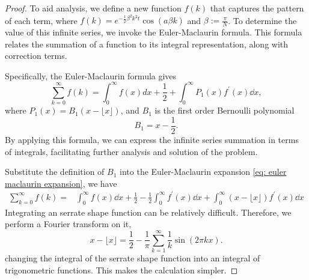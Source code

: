 \documentclass{article}
\begin{document}
\begin{proof}
To aid analysis, we define a new function $f(k)$ that captures the pattern of each term, where $f(k) = e^{-\frac{1}{2}\beta^2 k^2 t}\cos(a\beta k)$ and $\beta := \frac{\pi}{N}$. To determine the value of this infinite series, we invoke the Euler-Maclaurin formula. This formula relates the summation of a function to its integral representation, along with correction terms.

Specifically, the Euler-Maclaurin formula gives 
\begin{equation}
\label{eq: euler maclaurin expansion}
    \sum_{k=0}^{\infty} f(k)=\int_0^{\infty} f(x) d x+\frac{1}{2}+\int_0^{\infty} P_1(x) f^{\prime}(x) \dd x,
\end{equation}
where $P_1(x)=B_1(x-\lfloor x \rfloor)$, and $B_1$ is the first order Bernoulli polynomial
\begin{equation}
    B_1 = x-\frac{1}{2}.
\end{equation}
By applying this formula, we can express the infinite series summation in terms of integrals, facilitating further analysis and solution of the problem. 


Substitute the definition of $B_1$ into the Euler-Maclaurin expansion \eqref{eq: euler maclaurin expansion}, we have
\begin{align}
\sum_{k=0}^{\infty} f(k)=&\int_0^{\infty} f(x) \dd x+\frac{1}{2}-\frac{1}{2} \int_0^{\infty} f^{\prime}(x) \dd x+\int_0^{\infty}(x-\lfloor x\rfloor) f^{\prime}(x) \dd x
\label{eq: zz anonymous 15}
\end{align}
Integrating an serrate shape function can be relatively difficult. Therefore, we perform a Fourier transform on it, 
\begin{equation}
    x-\lfloor x\rfloor=\frac{1}{2}-\frac{1}{\pi} \sum_{k=1}^{\infty} \frac{1}{k} \sin (2 \pi k x).
\end{equation}
changing the integral of the serrate shape function into an integral of trigonometric functions. This makes the calculation simpler. 


\end{proof}
\end{document}
